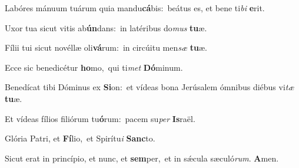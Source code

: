 Labóres mánuum tuárum quia mandu\textbf{cá}bis:~\redgreheightstar beátus es, et bene ti\textit{bi} \textbf{e}rit.

Uxor tua sicut vitis ab\textbf{ún}dans:~\redgreheightstar in latéribus do\textit{mus} \textbf{tu}æ.

Fílii tui sicut novéllæ oli\textbf{vá}rum:~\redgreheightstar in circúitu men\textit{sæ} \textbf{tu}æ.

Ecce sic benedicétur \textbf{ho}mo,~\redgreheightstar qui ti\textit{met} \textbf{Dó}minum.

Benedícat tibi Dóminus ex \textbf{Si}on:~\redgreheightstar et vídeas bona Jerúsalem ómnibus diébus vi\textit{tæ} \textbf{tu}æ.

Et vídeas fílios filiórum tu\textbf{ó}rum:~\redgreheightstar pacem su\textit{per} \textbf{Is}raël.

Glória Patri, et \textbf{Fí}lio,~\redgreheightstar et Spirítu\textit{i} \textbf{Sanc}to.

Sicut erat in princípio, et nunc, et \textbf{sem}per,~\redgreheightstar et in sǽcula sæculó\textit{rum}. \textbf{A}men.

